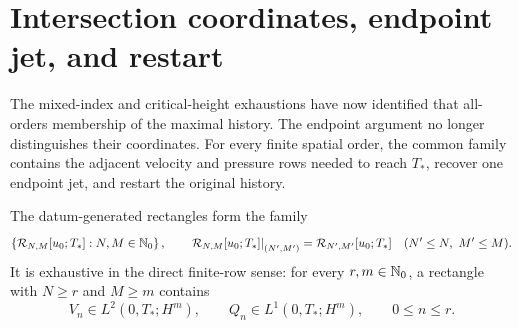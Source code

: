 \section{Intersection coordinates, endpoint jet, and restart}

The mixed-index and critical-height exhaustions have now identified that
all-orders membership of the maximal history.  The endpoint argument no longer
distinguishes their coordinates.  For every finite spatial order, the common
family contains the adjacent velocity and pressure rows needed to reach
\(T_*\), recover one endpoint jet, and restart the original history.


\begin{definition}
\label{u:def:compatible-intersection}
The datum-generated rectangles form the family
\begin{equation}
 \left\{\mathcal R_{N,M}[u_0;T_*]:N,M\in\mathbb N_0\right\},
 \qquad
 \left.\mathcal R_{N,M}[u_0;T_*]\right|_{(N',M')}
 =\mathcal R_{N',M'}[u_0;T_*]
 \quad(N'\le N,\ M'\le M).
 \label{u:eq:compatible-intersection-space}
\end{equation}
It is exhaustive in the direct finite-row sense: for every \(r,m\in\mathbb N_0\),
a rectangle with \(N\ge r\) and \(M\ge m\) contains
\begin{equation}
 V_n\in L^2(0,T_*;H^m),
 \qquad Q_n\in L^1(0,T_*;H^m),
 \qquad 0\le n\le r.
 \label{u:eq:compatible-intersection}
\end{equation}
\end{definition}

